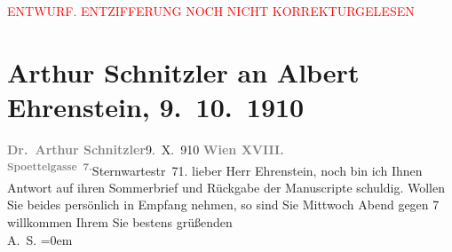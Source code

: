
\begin{center}
            \textcolor{red}{ENTWURF. ENTZIFFERUNG NOCH NICHT KORREKTURGELESEN}
                      \end{center}
            
               \section[Arthur Schnitzler an Albert Ehrenstein, 9. 10. 1910]{ Arthur Schnitzler an Albert Ehrenstein, 9. 10. 1910}\nopagebreak{}\rehead{ }\begin{ledgroupsized}[t]{13cm}\normalsize\beginnumbering{} \toendnotes[C]{\smallbreak\pagebreak[2]} 
\toendnotes[C]{\smallbreak}\pstart
           {\pb}\textcolor{gray}{\textbf{Dr. Arthur Schnitzler}}\hfill 9. X. 910\pend
           \pstart
           \textcolor{gray}{\textbf{Wien XVIII.}}{ }\substVorne{}\textsuperscript{\textcolor{gray}{\textbf{Spoettelgasse 7.}}}{\allowbreak}\substDazwischen{}Sternwartestr 71.\substHinten{}\pend
           \pstart{}lieber Herr Ehrenstein,\pend\pstart
           noch bin ich Ihnen Antwort auf ihren Sommerbrief und Rückgabe der Manuscripte
               schuldig. Wollen Sie beides
                    persönlich in Empfang nehmen, so sind Sie Mittwoch Abend gegen 7
                    willkommen\pend
           \pstart
           Ihrem Sie bestens grüßenden{\\[\baselineskip]}\spacefill\mbox{A. S.}\pend
           \leftskip=0em{}\endnumbering{}\end{ledgroupsized}  \newcommand{\dateiname}{L01965}\newcommand{\titel}{Arthur Schnitzler an Albert Ehrenstein, 9. 10. 1910}\newcommand{\editorInnen}{Martin Anton Müller und Gerd-Hermann Susen}
      